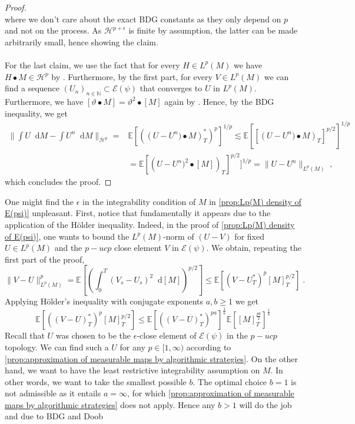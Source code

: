 \documentclass[11pt]{report}
\newcommand{\diff}{\mathop{}\!\mathrm{d}}
\theoremstyle{plain} %
\theoremstyle{definition} %
\theoremstyle{remark} %
\begin{document}
\begin{proof}
\begin{equation}
    \end{equation}
    where we don't care about the exact BDG constants as they only depend on \(p\) and not on the process. 
    As \(\mathcal{H}^{p+\epsilon}\) is finite by assumption, the latter can be made arbitrarily small, hence showing the claim. \\\\
    For the last claim, we use the fact that for every \(H\in L^p(M)\) we have \(H\bullet M\in\mathcal{H}^p\) by \parencite[Corollary.~12.3.6.]{CohenElliott2015StochasticCalculusApplications}. Furthermore, by the first part, for every \(V\in L^p(M)\) we can find a sequence \((U_n)_{n\in\mathbb{N}}\subset\mathcal{E}(\psi)\) that converges to \(U\) in \(L^p(M)\). Furthermore, we have \([\vartheta\bullet M]=\vartheta^2\bullet[M]\) again by \parencite[Corollary.~12.3.6.]{CohenElliott2015StochasticCalculusApplications}. Hence, by the BDG inequality, we get 
    \begin{align*}
        \lVert \int U\diff M-\int U^n\diff M\rVert_{\mathcal{H}^p}=&\mathbb{E}[\left(\left(U-U^n)\bullet M\right)^*_{T}\right)^p]^{1/p}\lesssim \mathbb{E}[[\left(U-U^n)\bullet M\right)_{T}]^{p/2}]^{1/p}\\&=\mathbb{E}[\left(U-U^n)^2\bullet [M]\right)_{T}]^{p/2}]^{1/p}
        =\lVert U-U^n\rVert_{L^p(M)}\;,
    \end{align*}
    which concludes the proof. 
\end{proof}
One might find the \(\epsilon\) in the integrability condition of \(M\) in \cref{prop:Lp(M) density of E(psi)} unpleasant. First, notice that fundamentally it appears due to the application of the Hölder inequality. Indeed, in the proof of \cref{prop:Lp(M) density of E(psi)}, one wants to bound the \(L^p(M)\)-norm of \((U-V)\) for fixed \(U\in L^p(M)\) and the \(p-ucp\) close element \(V\) in \(\mathcal{E}(\psi)\). We obtain, repeating the first part of the proof, 
 \begin{equation}
        \rVert V-U\lVert_{L^p(M)}^p=\mathbb{E}[\left(\int_{0}^{T}(V_s-U_s)^2\diff[M]\right)^{p/2}]\leq\mathbb{E}[(V-U_{T}^*)^p[M]_{T}^{p/2}]\;.
\end{equation}\;
Applying Hölder's inequality with conjugate exponents \(a,b\geq 1\) we get 
\begin{equation}
    \mathbb{E}[((V-U)_{T}^*)^p[M]_{T}^{p/2}]\leq \mathbb{E}[((V-U)_{T}^*)^{pa}]^{\frac{1}{a}}\mathbb{E}[[M]_{T}^{\frac{pb}{2}}]^{\frac{1}{b}}
\end{equation}
Recall that \(U\) was chosen to be the \(\epsilon\)-close element of \(\mathcal{E}(\psi)\) in the \(p-ucp\) topology. We can find such a \(U\) for any \(p\in[1,\infty)\) according to \cref{prop:approximation of measurable maps by algorithmic strategies}. On the other hand, we want to have the least restrictive integrability assumption on \(M\). In other words, we want to take the smallest possible \(b\). The optimal choice \(b=1\) is not admissible as it entails \(a=\infty\), for which \cref{prop:approximation of measurable maps by algorithmic strategies} does not apply. Hence any \(b>1\) will do the job and due to BDG and Doob
\end{document}
